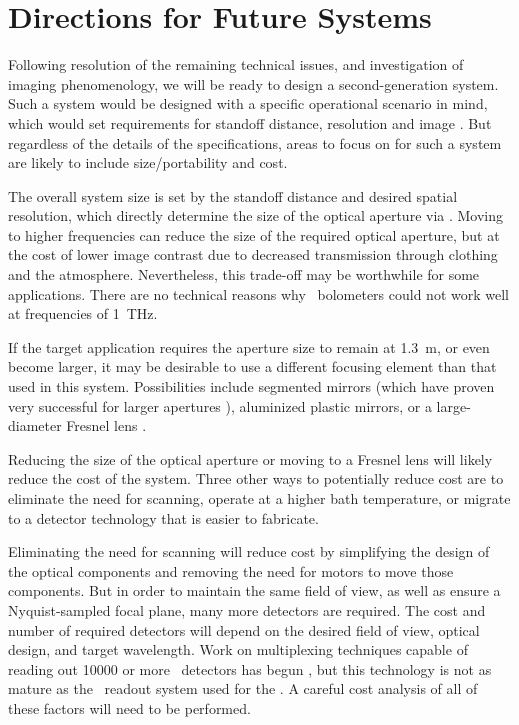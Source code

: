 \section{Directions for Future Systems}

Following resolution of the remaining technical issues, and investigation of imaging phenomenology, we will be ready to design a second-generation system.
Such a system would be designed with a specific operational scenario in mind, which would set requirements for standoff distance, resolution and image \NETD.
But regardless of the details of the specifications, areas to focus on for such a system are likely to include size/portability and cost.

The overall system size is set by the standoff distance and desired spatial resolution, which directly determine the size of the optical aperture via .
Moving to higher frequencies can reduce the size of the required optical aperture, but at the cost of lower image contrast due to decreased transmission through clothing and the atmosphere.
Nevertheless, this trade-off may be worthwhile for some applications.
There are no technical reasons why \TES\ bolometers could not work well at frequencies of \SI{1}{\THz}.

If the target application requires the aperture size to remain at \SI{1.3}{\m}, or even become larger, it may be desirable to use a different focusing element than that used in this system.
Possibilities include segmented mirrors (which have proven very successful for larger apertures \cite{fowler_optical_2007}), aluminized plastic mirrors, or a large-diameter Fresnel lens \cite{black_millimeter-wave_1987}.

Reducing the size of the optical aperture or moving to a Fresnel lens will likely reduce the cost of the system.
Three other ways to potentially reduce cost are to eliminate the need for scanning, operate at a higher bath temperature, or migrate to a detector technology that is easier to fabricate.

Eliminating the need for scanning will reduce cost by simplifying the design of the optical components and removing the need for motors to move those components.
But in order to maintain the same field of view, as well as ensure a Nyquist-sampled focal plane, many more detectors are required.
The cost and number of required detectors will depend on the desired field of view, optical design, and target wavelength.
Work on multiplexing techniques capable of reading out \num{10000} or more \TES\ detectors has begun \cite{irwin_advanced_2012}, but this technology is not as mature as the \TDM\ readout system used for the \Imager.
A careful cost analysis of all of these factors will need to be performed.

